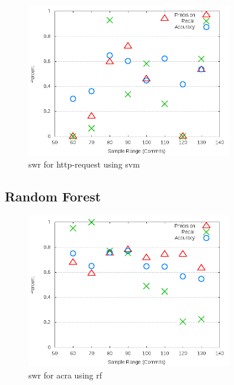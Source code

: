 \begin{figure}[!t]
\centering
\includegraphics[width=0.8\textwidth]{images/svm/test_1/http-request_sample_range.png}
\caption{\gls{swr} for http-request using \gls{svm}}
\label{fig:test_1_http-request_svm}
\end{figure}

\subsection{Random Forest}
\label{app_sub:experiment_1_rf}

\begin{figure}[!t]
\centering
\includegraphics[width=0.8\textwidth]{images/rf/test_1/acra_sample_range.png}
\caption{\gls{swr} for acra using \gls{rf}}
\label{fig:test_1_acra_rf}
\end{figure}

